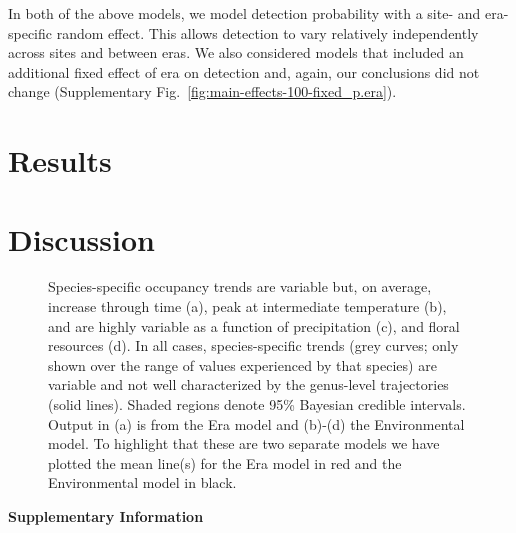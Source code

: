 \documentclass[12pt]{article}
\begin{document}
In both of the above models, we model detection probability with a site- and era-specific random effect. This allows detection to vary relatively independently across sites and between eras. We also considered models that included an additional fixed effect of era on detection and, again, our conclusions did not change (Supplementary Fig.~\ref{fig:main-effects-100-fixed_p.era}).

\section{Results} 

\section{Discussion} 


\begin{figure}[ht]
  \begin{center}
  \end{center}
  \caption{Species-specific occupancy trends are variable but, on average, increase through time (a), peak at intermediate temperature (b), and are highly variable as a function of precipitation (c), and floral resources (d). In all cases, species-specific trends (grey curves; only shown over the range of values experienced by that species) are variable and not well characterized by the genus-level trajectories (solid lines). Shaded regions denote 95\% Bayesian credible intervals. Output in (a) is from the Era model and (b)-(d) the Environmental model. To highlight that these are two separate models we have plotted the mean line(s) for the Era model in red and the Environmental model in black.}
  \label{fig:main-effects-100}
\end{figure}
\clearpage


\clearpage


\clearpage

\renewcommand{\thesection}{S\arabic{section}}
\setcounter{section}{0}
\renewcommand{\theequation}{S\arabic{equation}}
\setcounter{equation}{0}
\renewcommand{\thetable}{S\arabic{table}}
\setcounter{table}{0}  %
\renewcommand{\thefigure}{S\arabic{figure}}
\setcounter{figure}{0}  %
\setcounter{page}{1}

\begin{center}
 {\LARGE\textbf{Supplementary Information}}
\end{center}
\end{document}
